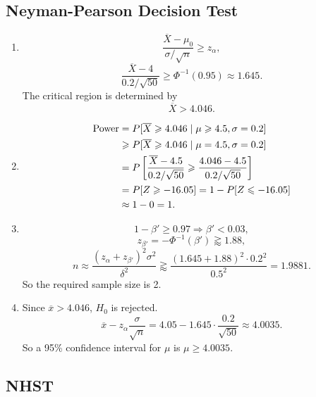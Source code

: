 \documentclass[11pt,a4paper]{article}
\author{Group 37}
\subtitle{Assignment}
\begin{document}
\maketitle

\subsection{Neyman-Pearson Decision Test}

\begin{enumerate}[label=\roman*)]
\item
$$\frac{\overline{X}-\mu_0}{\sigma/\sqrt{n}}\geqslant z_{\alpha},$$
$$\frac{\overline{X}-4}{0.2/\sqrt{50}}\geqslant\Phi^{-1}(0.95)\approx1.645.$$
The critical region is determined by
$$\overline{X}>4.046.$$
\item
\begin{align*}
{\rm Power}&=P[\overline{X}\geqslant 4.046\mid \mu\geqslant 4.5,\sigma=0.2]\\
&\geqslant P[\overline{X}\geqslant 4.046\mid \mu= 4.5,\sigma=0.2]\\
&=P\left[\frac{\overline{X}-4.5}{0.2/\sqrt{50}}\geqslant\frac{4.046-4.5}{0.2/\sqrt{50}}\right]\\
&=P[Z\geqslant -16.05]=1-P[Z\leqslant -16.05]\\
&\approx 1-0=1.
\end{align*}
\item
$$1-\beta'\geqslant0.97\Longrightarrow\beta'<0.03,$$
$$z_{\beta'}=-\Phi^{-1}(\beta')\gtrapprox 1.88,$$
$$n\approx\frac{(z_\alpha+z_{\beta'})^2\sigma^2}{\delta^2}\gtrapprox\frac{(1.645+1.88)^2\cdot0.2^2}{0.5^2}=1.9881.$$
So the required sample size is 2.
\item
Since $\overline{x}>4.046$, $H_0$ is rejected.
$$\overline{x}-z_\alpha\frac{\sigma}{\sqrt{n}}=4.05-1.645\cdot\frac{0.2}{\sqrt{50}}\approx4.0035.$$
So a 95\% confidence interval for $\mu$ is $\mu\geqslant4.0035$.
\end{enumerate}

\subsection{NHST}
\end{document}
